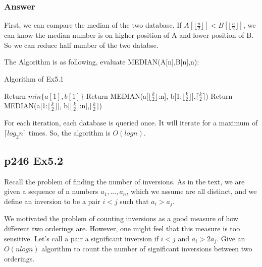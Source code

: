 \documentclass[a4paper]{article}
\begin{document}
\subsubsection*{Answer}
First, we can compare the median of the two database. If $A[\lfloor \frac{n}{2} \rfloor]<B[\lfloor \frac{n}{2} \rfloor]$, we can know the median number is on higher position of A and lower position of B. So we can reduce half number of the two databse.
\par The Algorithm is as following, evaluate MEDIAN(A[n],B[n],n):
\begin{algorithm}[!htb]
	\caption{Algorithm of Ex5.1}
	\begin{algorithmic}[1]
		\State Return $min\{a[1],b[1]\}$
		\State Return MEDIAN(a[$\lfloor \frac{k}{2} \rfloor$:n], b[1:$\lfloor \frac{k}{2} \rfloor$],$\lceil \frac{k}{2} \rceil$)
		\Else
		\State Return MEDIAN(a[1:$\lfloor \frac{k}{2} \rfloor$], b[$\lfloor \frac{k}{2} \rfloor$:n],$\lceil \frac{k}{2} \rceil$)
		\EndIf
		\EndFunction
	\end{algorithmic}
\end{algorithm}
\par For each iteration, each database is queried once. It will iterate for a maximum of $\lceil log_2n \rceil$ times. So, the algorithm is $O(logn)$.
\vspace{2cm}

\subsection*{p246 Ex5.2}
\begin{adjustwidth}{1cm}{1cm}
	Recall the problem of finding the number of inversions. As in the text,
	we are given a sequence of n numbers $a_1, . . . , a_n$, which we assume are all
	distinct, and we define an inversion to be a pair $i < j$ such that $a_i > a_j$.
	\par We motivated the problem of counting inversions as a good measure
	of how different two orderings are. However, one might feel that this
	measure is too sensitive. Let’s call a pair a significant inversion if $i < j$ and
	$a_i > 2a_j$. Give an $O(n log n)$ algorithm to count the number of significant
	inversions between two orderings.
\end{adjustwidth}
\end{document}
